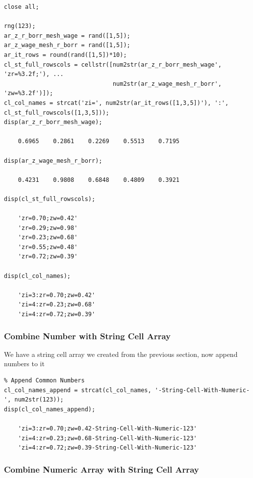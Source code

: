 \documentclass[
]{book}
\begin{document}
\begin{verbatim}
close all;

rng(123);
ar_z_r_borr_mesh_wage = rand([1,5]);
ar_z_wage_mesh_r_borr = rand([1,5]);
ar_it_rows = round(rand([1,5])*10);
cl_st_full_rowscols = cellstr([num2str(ar_z_r_borr_mesh_wage', 'zr=%3.2f;'), ...
                               num2str(ar_z_wage_mesh_r_borr', 'zw=%3.2f')]);
cl_col_names = strcat('zi=', num2str(ar_it_rows([1,3,5])'), ':', cl_st_full_rowscols([1,3,5]));
disp(ar_z_r_borr_mesh_wage);

    0.6965    0.2861    0.2269    0.5513    0.7195

disp(ar_z_wage_mesh_r_borr);

    0.4231    0.9808    0.6848    0.4809    0.3921

disp(cl_st_full_rowscols);

    'zr=0.70;zw=0.42'
    'zr=0.29;zw=0.98'
    'zr=0.23;zw=0.68'
    'zr=0.55;zw=0.48'
    'zr=0.72;zw=0.39'

disp(cl_col_names);

    'zi=3:zr=0.70;zw=0.42'
    'zi=4:zr=0.23;zw=0.68'
    'zi=4:zr=0.72;zw=0.39'
\end{verbatim}

\hypertarget{combine-number-with-string-cell-array}{%
\subsubsection{Combine Number with String Cell Array}\label{combine-number-with-string-cell-array}}

We have a string cell array we created from the previous section, now
append numbers to it

\begin{verbatim}
% Append Common Numbers
cl_col_names_append = strcat(cl_col_names, '-String-Cell-With-Numeric-', num2str(123));
disp(cl_col_names_append);

    'zi=3:zr=0.70;zw=0.42-String-Cell-With-Numeric-123'
    'zi=4:zr=0.23;zw=0.68-String-Cell-With-Numeric-123'
    'zi=4:zr=0.72;zw=0.39-String-Cell-With-Numeric-123'
\end{verbatim}

\hypertarget{combine-numeric-array-with-string-cell-array}{%
\subsubsection{Combine Numeric Array with String Cell Array}\label{combine-numeric-array-with-string-cell-array}}
\end{document}
